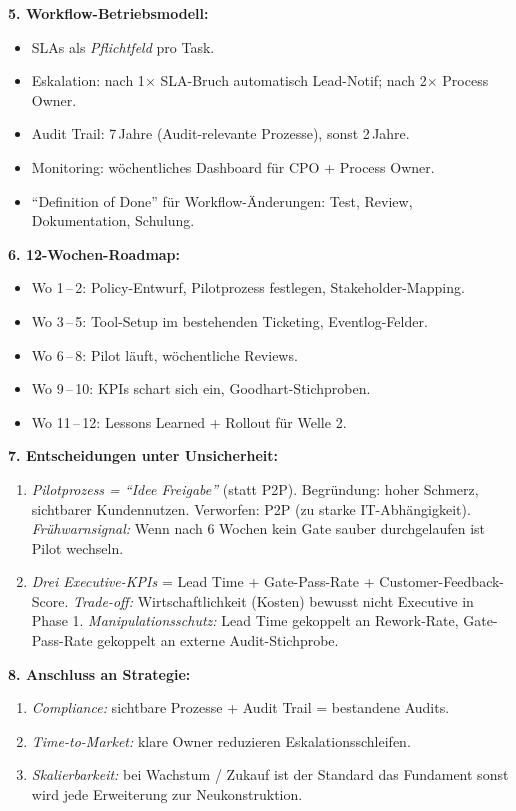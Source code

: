 \documentclass[11pt,a4paper,oneside]{article}
\begin{document}
\begin{loesungbox}
\smallskip
\textbf{5. Workflow-Betriebsmodell:}
\begin{itemize}
  \item SLAs als \emph{Pflichtfeld} pro Task.
  \item Eskalation: nach 1$\times$ SLA-Bruch automatisch Lead-Notif; nach 2$\times$ \textrightarrow{} Process Owner.
  \item Audit Trail: 7\,Jahre (Audit-relevante Prozesse), sonst 2\,Jahre.
  \item Monitoring: w\"ochentliches Dashboard f\"ur CPO + Process Owner.
  \item ``Definition of Done'' f\"ur Workflow-\"Anderungen: Test, Review, Dokumentation, Schulung.
\end{itemize}

\smallskip
\textbf{6. 12-Wochen-Roadmap:}
\begin{itemize}
  \item Wo 1\,--\,2: Policy-Entwurf, Pilotprozess festlegen, Stakeholder-Mapping.
  \item Wo 3\,--\,5: Tool-Setup im bestehenden Ticketing, Eventlog-Felder.
  \item Wo 6\,--\,8: Pilot l\"auft, w\"ochentliche Reviews.
  \item Wo 9\,--\,10: KPIs schart sich ein, Goodhart-Stichproben.
  \item Wo 11\,--\,12: Lessons Learned + Rollout f\"ur Welle 2.
\end{itemize}

\smallskip
\textbf{7. Entscheidungen unter Unsicherheit:}
\begin{enumerate}
  \item \emph{Pilotprozess = ``Idee \textrightarrow{} Freigabe''} (statt P2P). Begr\"undung: hoher Schmerz, sichtbarer Kundennutzen. Verworfen: P2P (zu starke IT-Abh\"angigkeit). \emph{Fr\"uhwarnsignal:} Wenn nach 6 Wochen kein Gate sauber durchgelaufen ist \textrightarrow{} Pilot wechseln.
  \item \emph{Drei Executive-KPIs} = Lead Time + Gate-Pass-Rate + Customer-Feedback-Score. \emph{Trade-off:} Wirtschaftlichkeit (Kosten) bewusst nicht Executive in Phase 1. \emph{Manipulationsschutz:} Lead Time gekoppelt an Rework-Rate, Gate-Pass-Rate gekoppelt an externe Audit-Stichprobe.
\end{enumerate}

\smallskip
\textbf{8. Anschluss an Strategie:}
\begin{enumerate}
  \item \emph{Compliance:} sichtbare Prozesse + Audit Trail = bestandene Audits.
  \item \emph{Time-to-Market:} klare Owner reduzieren Eskalations\-schleifen.
  \item \emph{Skalierbarkeit:} bei Wachstum / Zukauf ist der Standard das Fundament \textendash{} sonst wird jede Erweiterung zur Neukonstruktion.
\end{enumerate}
\end{loesungbox}
\end{document}
